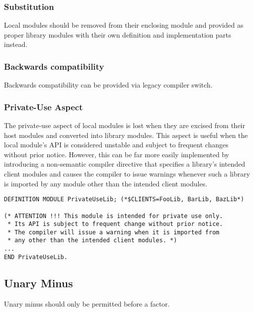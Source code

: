 \documentclass[10pt,a4paper]{article} %
\begin{document}
\subsubsection{Substitution}
Local modules should be removed from their enclosing module and provided as proper library modules with their own definition and implementation parts instead.

\subsubsection{Backwards compatibility}

Backwards compatibility can be provided via legacy compiler switch.

\subsubsection{Private-Use Aspect}

The private-use aspect of local modules is lost when they are excised from their host modules and converted into library modules. This aspect is useful when the local module's API is considered unstable and subject to frequent changes without prior notice. However, this can be far more easily implemented by introducing a \gls{non-semantic compiler directive} that specifies a library's intended client modules and causes the compiler to issue warnings whenever such a library is imported by any module other than the intended client modules.

\begin{verbatim}
DEFINITION MODULE PrivateUseLib; (*$CLIENTS=FooLib, BarLib, BazLib*)

(* ATTENTION !!! This module is intended for private use only.
 * Its API is subject to frequent change without prior notice.
 * The compiler will issue a warning when it is imported from
 * any other than the intended client modules. *)
...
END PrivateUseLib.
\end{verbatim}


\subsection{Unary Minus}

Unary minus should only be permitted before a factor.
\end{document}
